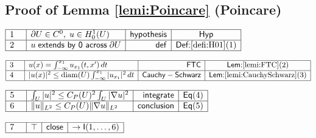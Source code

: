 \documentclass[11pt,reqno]{amsart}
\begin{document}
	\subsection*{Proof of Lemma \protect\ref{lemi:Poincare} (\textsf{Poincare})}
	\noindent$\begin{array}{|m{0.5cm}|l|r|c|}
	\hline
	1 & \partial U\in C^{0},\;u\in H_{0}^{1}(U) & \mathsf{hypothesis} & \mathsf{Hyp} \\ \hline
	2 & u\;\mathsf{extends\ by\ 0\ across}\;\partial U & \mathsf{def} & \textsf{Def:}\ref{defi:H01}(1) \\ \hline
	\end{array}$
	\par\nointerlineskip\noindent$\begin{array}{|m{0.5cm}|l|r|c|}
	\hline
	3 & u(x)=\int_{-\infty}^{x_{1}}u_{x_{1}}(t,x^{\prime})\,dt & \mathsf{FTC} & \textsf{Lem:}\ref{lemi:FTC}(2) \\ \hline
	4 & |u(x)|^{2}\le\mathrm{diam}(U)\int_{-\infty}^{x_{1}}|u_{x_{1}}|^{2}\,dt & \mathsf{Cauchy-Schwarz} & \textsf{Lem:}\ref{lemi:CauchySchwarz}(3) \\ \hline
	\end{array}$
	\par\nointerlineskip\noindent$\begin{array}{|m{0.5cm}|l|r|c|}
	\hline
	5 & \int_{U}|u|^{2}\le C_{P}(U)^{2}\int_{U}|\nabla u|^{2} & \mathsf{integrate} & \mathsf{Eq}(4) \\ \hline
	6 & \|u\|_{L^{2}}\le C_{P}(U)\|\nabla u\|_{L^{2}} & \mathsf{conclusion} & \mathsf{Eq}(5) \\ \hline
	\end{array}$
	\par\nointerlineskip\noindent$\begin{array}{|m{0.5cm}|l|r|c|}
	\hline
	7 & \top & \mathsf{close} & \to\mathsf{I}(1,\dots,6) \\ \hline
	\end{array}$
	\medskip
	
\end{document}

